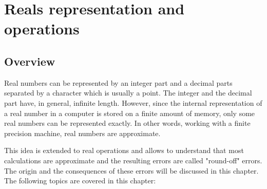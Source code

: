 \renewcommand\home{./Fortran_project/sources/IEEE}

\chapter{Reals representation and operations} \label{chap:reals}
     
\section*{Overview}

Real numbers can be represented by 
an integer part and a decimal parts separated by a character which is usually a point. 
The integer and the decimal part have, in general, infinite length.  
However, since the internal representation of a real number 
in a computer  is stored  on a finite amount of memory, 
only some real numbers can be represented exactly. 
In other words, working with a finite precision machine,  real numbers are approximate.

    


This idea is extended to real operations and allows to understand that most calculations 
are approximate and the resulting errors are called "round-off" errors. 
The origin and the consequences of these errors will be discussed in this chapter. 
The following topics are covered in this chapter: 
%




  
  
